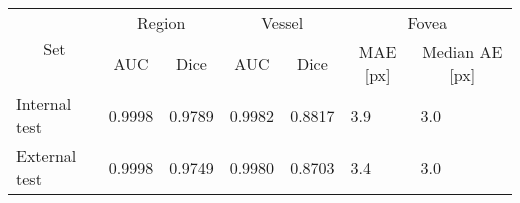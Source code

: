 \begin{tabular}{@{}lllllll@{}}
\toprule
  \multicolumn{1}{c}{\multirow{2}{*}{Set}} &
  \multicolumn{2}{c}{Region} &
  \multicolumn{2}{c}{Vessel} &
  \multicolumn{2}{c}{Fovea} \\
  \cmidrule(l){2-3}\cmidrule(l){4-5}\cmidrule(l){6-7}
  \multicolumn{1}{c}{} &
  \multicolumn{1}{c}{\acrshort{AUC}} &
  \multicolumn{1}{c}{Dice} &
  \multicolumn{1}{c}{\acrshort{AUC}} &
  \multicolumn{1}{c}{Dice} &
  \multicolumn{1}{c}{\acrshort{MAE} [px]} &
  \multicolumn{1}{c}{Median AE [px]} \\
  \midrule
Internal test & 0.9998 & 0.9789 & 0.9982 & 0.8817 & 3.9 & 3.0 \\
External test & 0.9998 & 0.9749 & 0.9980 & 0.8703 & 3.4 & 3.0 \\ \bottomrule
\end{tabular}
